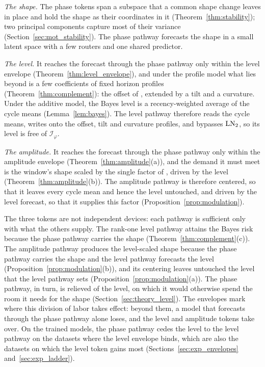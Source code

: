 {\emph{The shape.} The phase tokens span a subspace that a common shape change leaves in place and hold the shape as their coordinates in it (Theorem~\ref{thm:stability}); two principal components capture most of their variance (Section~\ref{sec:mot_stability}). The phase pathway forecasts the shape in a small latent space with a few routers and one shared predictor.

\emph{The level.} It reaches the forecast through the phase pathway only within the level envelope (Theorem~\ref{thm:level_envelope}), and under the profile model what lies beyond is a few coefficients of fixed horizon profiles (Theorem~\ref{thm:complement}): the offset of , extended by a tilt and a curvature. Under the additive model, the Bayes level is a recency-weighted average of the cycle means (Lemma~\ref{lem:bayes}). The level pathway therefore reads the cycle means, writes onto the offset, tilt and curvature profiles, and bypasses $\operatorname{LN}_2$, so its level is free of $\mathcal I_\varphi$.

\emph{The amplitude.} It reaches the forecast through the phase pathway only within the amplitude envelope (Theorem~\ref{thm:amplitude}(a)), and the demand it must meet is the window's shape scaled by the single factor of , driven by the level (Theorem~\ref{thm:amplitude}(b)). The amplitude pathway is therefore centered, so that it leaves every cycle mean and hence the level untouched, and driven by the level forecast, so that it supplies this factor (Proposition~\ref{prop:modulation}).



The three tokens are not independent devices: each pathway is sufficient only with what the others supply. The rank-one level pathway attains the Bayes risk because the phase pathway carries the shape (Theorem~\ref{thm:complement}(c)). The amplitude pathway produces the level-scaled shape because the phase pathway carries the shape and the level pathway forecasts the level (Proposition~\ref{prop:modulation}(b)), and its centering leaves untouched the level that the level pathway sets (Proposition~\ref{prop:modulation}(a)). The phase pathway, in turn, is relieved of the level, on which it would otherwise spend the room it needs for the shape (Section~\ref{sec:theory_level}). The envelopes mark where this division of labor takes effect: beyond them, a model that forecasts through the phase pathway alone loses, and the level and amplitude tokens take over. On the trained models, the phase pathway cedes the level to the level pathway on the datasets where the level envelope binds, which are also the datasets on which the level token gains most (Sections~\ref{sec:exp_envelopes} and~\ref{sec:exp_ladder}).

}
